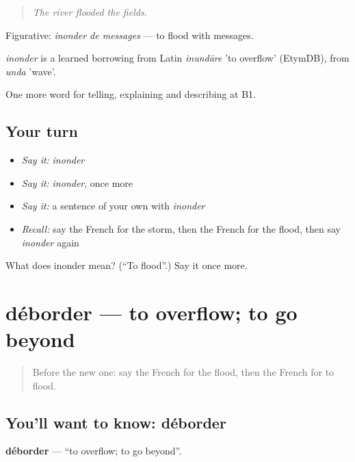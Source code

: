 \begin{quote}
\emph{The river flooded the fields.}
\end{quote}

Figurative: \emph{inonder de messages} — to flood with messages.

\begin{cousinweb}
\emph{inonder} is a learned borrowing from Latin \emph{inundāre} 'to overflow' (EtymDB), from \emph{unda} 'wave'.
\end{cousinweb}

\begin{grammarlens}[title={What you've built}]
One more word for telling, explaining and describing at B1.
\end{grammarlens}

\subsection*{Your turn}
\begin{itemize}
\raggedright
  \item \emph{Say it:} \emph{inonder}
  \item \emph{Say it:} \emph{inonder}, once more
  \item \emph{Say it:} a sentence of your own with \emph{inonder}
  \item \emph{Recall:} say the French for the storm, then the French for the flood, then say \emph{inonder} again
\end{itemize}

\begin{tcolorbox}[breakable,colback=teal!4,colframe=teal!35!black,title={Before you move on}]
What does inonder mean? (\textquotedblleft{}To flood\textquotedblright{}.) Say it once more.
\end{tcolorbox}
\section[déborder]{déborder — to overflow; to go beyond}

\label{lesson:FR-C465-deborder}



\begin{quote}
Before the new one: say the French for the flood, then the French for to flood.
\end{quote}

\subsection*{You'll want to know: déborder}
\textbf{déborder} — \textquotedblleft{}to overflow; to go beyond\textquotedblright{}.

